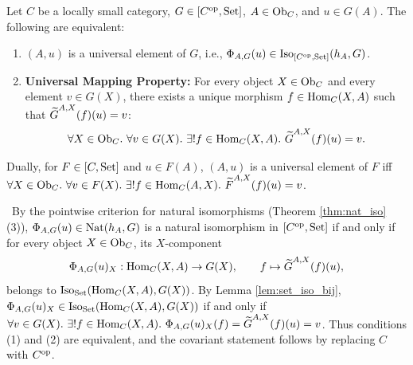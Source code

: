 \documentclass[10pt,a4paper]{article}
\begin{document}
\begin{theorem}\label{thm:univ_elem_char}
Let $C$ be a locally small category, $G \in [C^{\textrm{op}}, {\textrm{Set}}]$, $A \in {\textrm{Ob}}_C$, and $u \in G(A)$. The following are equivalent:
\begin{enumerate}
\item $(A, u)$ is a universal element of $G$, i.e., $\Phi_{A,G}(u) \in {\mathrm{Iso}}_{[C^{\textrm{op}},{\textrm{Set}}]}(h_A, G)$.
\item \textbf{Universal Mapping Property:} For every object $X \in {\textrm{Ob}}_C$ and every element $v \in G(X)$, there exists a unique morphism $f \in {\textrm{Hom}}_C(X, A)$ such that ${\widetilde{G}\textrm{}}^{A,X}(f)(u) = v$:
$$\forall X \in \Ob_C.\ \forall v \in G(X).\ \exists !f \in \Hom_C(X, A).\ \GMor^{A,X}(f)(u) = v.$$
\end{enumerate}
Dually, for $F \in [C, {\textrm{Set}}]$ and $u \in F(A)$, $(A, u)$ is a universal element of $F$ iff $\forall X \in {\textrm{Ob}}_C.\ \forall v \in F(X).\ \exists !f \in {\textrm{Hom}}_C(A, X).\ {\widetilde{F}\textrm{}}^{A,X}(f)(u) = v$.
\end{theorem}
\myprf\ By the pointwise criterion for natural isomorphisms (Theorem \ref{thm:nat_iso}(3)), $\Phi_{A,G}(u) \in {\textrm{Nat}}(h_A, G)$ is a natural isomorphism in $[C^{\textrm{op}}, {\textrm{Set}}]$ if and only if for every object $X \in {\textrm{Ob}}_C$, its $X$-component
$$\Phi_{A,G}(u)_X : {\textrm{Hom}}_C(X, A) \to G(X), \qquad f \mapsto {\widetilde{G}\textrm{}}^{A,X}(f)(u),$$
 belongs to ${\mathrm{Iso}}_{\textrm{Set}}({\textrm{Hom}}_C(X, A), G(X))$. By Lemma \ref{lem:set_iso_bij}, $\Phi_{A,G}(u)_X \in {\mathrm{Iso}}_{\textrm{Set}}({\textrm{Hom}}_C(X, A), G(X))$ if and only if $\forall v \in G(X).\ \exists !f \in {\textrm{Hom}}_C(X,A).\ \Phi_{A,G}(u)_X(f) = {\widetilde{G}\textrm{}}^{A,X}(f)(u) = v$. Thus conditions (1) and (2) are equivalent, and the covariant statement follows by replacing $C$ with $C^{\textrm{op}}$. \myqed
\end{document}
